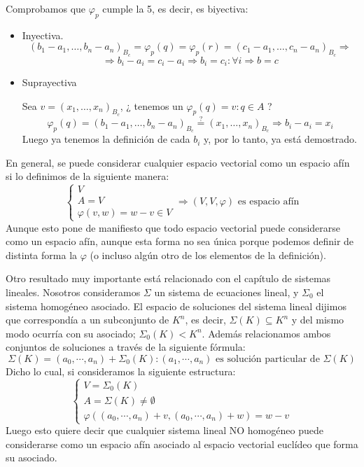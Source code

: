 \documentclass[10pt,a4paper,openright]{book}
\begin{document}
Comprobamos que $\varphi_p $ cumple la 5, es decir, es biyectiva:
\begin{itemize}
\item Inyectiva.
$$(b_1 - a_1 , \ldots , b_n - a_n)_{B_c}= \varphi_p (q) = \varphi_p (r) = (c_1 - a_1 , \ldots , c_n - a_n)_{B_c} \Rightarrow $$
$$\Rightarrow b_i - a_i = c_i - a_i \Rightarrow b_i = c_i : \forall i \Rightarrow b = c$$

\item Suprayectiva

Sea $v=(x_1, \ldots, x_n)_{B_c}$, ¿ tenemos un $ \varphi_p (q) = v : q\in A$ ?
$$\varphi_p (q)=(b_1 - a_1 , \ldots , b_n - a_n)_{B_c}\overset{?}{=}(x_1, \ldots, x_n)_{B_c} \Rightarrow b_i - a_i = x_i$$
Luego ya tenemos la definición de cada $b_i$ y, por lo tanto, ya está demostrado.
\end{itemize}


En general, se puede considerar cualquier espacio vectorial como un espacio afín si lo definimos de la siguiente manera:
$$\begin{cases} V \\ A = V \\ \varphi(v,w) = w - v \in V \end{cases} \Rightarrow (V,V,\varphi)\mbox{ es espacio afín}$$
Aunque esto pone de manifiesto que todo espacio vectorial puede considerarse como un espacio afín, aunque esta forma no sea única porque podemos definir de distinta forma la $\varphi$ (o incluso algún otro de los elementos de la definición).

Otro resultado muy importante está relacionado con el capítulo de sistemas lineales. Nosotros consideramos $\Sigma $ un sistema de ecuaciones lineal, y $\Sigma_0$ el sistema homogéneo asociado. El espacio de soluciones del sistema lineal dijimos que correspondía a un subconjunto de $K^n$, es decir, $\Sigma(K) \subseteq K^n$ y del mismo modo ocurría con su asociado; $\Sigma_0 (K) < K^n$. Además relacionamos ambos conjuntos de soluciones a través de la siguiente fórmula:
$$\Sigma(K) = (a_0, \cdots , a_n) + \Sigma_0(K): (a_1, \cdots, a_n)\mbox{ es solución particular de }\Sigma(K)$$
Dicho lo cual, si consideramos la siguiente estructura:
$$\begin{cases} V = \Sigma_0(K) \\ A = \Sigma(K)\neq \emptyset \\ \varphi((a_0, \cdots, a_n)+v, (a_0, \cdots, a_n)+ w) = w-v\end{cases}$$
Luego esto quiere decir que cualquier sistema lineal NO homogéneo puede considerarse como un espacio afín asociado al espacio vectorial euclídeo que forma su asociado.
\end{document}
